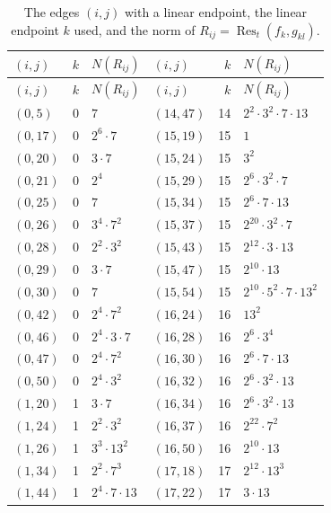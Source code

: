 \documentclass[11pt]{article}
\begin{document}
\begingroup\small
\setlength{\LTcapwidth}{\textwidth}
\begin{longtable}{@{}lrl@{\qquad}lrl@{}}
\caption{The edges $(i,j)$ with a linear endpoint, the linear endpoint $k$ used, and the norm of $R_{ij}=\operatorname{Res}_t(f_k,g_{kl})$.}\label{tab:sep}\\
\hline $(i,j)$ & $k$ & $N(R_{ij})$ & $(i,j)$ & $k$ & $N(R_{ij})$\\\hline\endfirsthead\hline $(i,j)$ & $k$ & $N(R_{ij})$ & $(i,j)$ & $k$ & $N(R_{ij})$\\\hline\endhead\hline\endfoot
$(0,5)$ & 0 & $7$ & $(14,47)$ & 14 & $2^{2}\cdot 3^{2}\cdot 7\cdot 13$\\
$(0,17)$ & 0 & $2^{6}\cdot 7$ & $(15,19)$ & 15 & $1$\\
$(0,20)$ & 0 & $3\cdot 7$ & $(15,24)$ & 15 & $3^{2}$\\
$(0,21)$ & 0 & $2^{4}$ & $(15,29)$ & 15 & $2^{6}\cdot 3^{2}\cdot 7$\\
$(0,25)$ & 0 & $7$ & $(15,34)$ & 15 & $2^{6}\cdot 7\cdot 13$\\
$(0,26)$ & 0 & $3^{4}\cdot 7^{2}$ & $(15,37)$ & 15 & $2^{20}\cdot 3^{2}\cdot 7$\\
$(0,28)$ & 0 & $2^{2}\cdot 3^{2}$ & $(15,43)$ & 15 & $2^{12}\cdot 3\cdot 13$\\
$(0,29)$ & 0 & $3\cdot 7$ & $(15,47)$ & 15 & $2^{10}\cdot 13$\\
$(0,30)$ & 0 & $7$ & $(15,54)$ & 15 & $2^{10}\cdot 5^{2}\cdot 7\cdot 13^{2}$\\
$(0,42)$ & 0 & $2^{4}\cdot 7^{2}$ & $(16,24)$ & 16 & $13^{2}$\\
$(0,46)$ & 0 & $2^{4}\cdot 3\cdot 7$ & $(16,28)$ & 16 & $2^{6}\cdot 3^{4}$\\
$(0,47)$ & 0 & $2^{4}\cdot 7^{2}$ & $(16,30)$ & 16 & $2^{6}\cdot 7\cdot 13$\\
$(0,50)$ & 0 & $2^{4}\cdot 3^{2}$ & $(16,32)$ & 16 & $2^{6}\cdot 3^{2}\cdot 13$\\
$(1,20)$ & 1 & $3\cdot 7$ & $(16,34)$ & 16 & $2^{6}\cdot 3^{2}\cdot 13$\\
$(1,24)$ & 1 & $2^{2}\cdot 3^{2}$ & $(16,37)$ & 16 & $2^{22}\cdot 7^{2}$\\
$(1,26)$ & 1 & $3^{3}\cdot 13^{2}$ & $(16,50)$ & 16 & $2^{10}\cdot 13$\\
$(1,34)$ & 1 & $2^{2}\cdot 7^{3}$ & $(17,18)$ & 17 & $2^{12}\cdot 13^{3}$\\
$(1,44)$ & 1 & $2^{4}\cdot 7\cdot 13$ & $(17,22)$ & 17 & $3\cdot 13$\\

\end{longtable}
\end{document}
